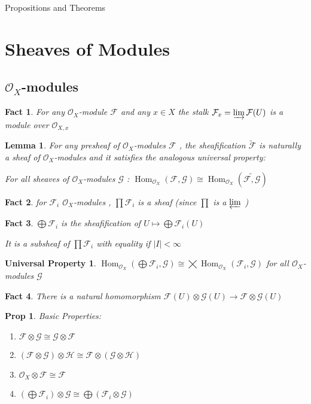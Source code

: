 \documentclass[a4paper, 12pt]{article}
\newcommand{\ca}[1]{\mathcal{#1}}
\newcommand{\caf}{\mathcal{F}}
\newcommand{\cag}{\mathcal{G}}
\newcommand{\oxmod}{$\mathcal{O}_X$-module }
\newcommand{\oxmods}{$\mathcal{O}_X$-modules }
\newcommand{\ox}{\mathcal{O}_X}
\newcommand{\oxx}{\mathcal{O}_{X,x}}
\newtheorem*{prop}{Prop}
\newtheorem*{lem}{Lemma}
\newtheorem*{fact}{Fact}
\newtheorem*{up}{Universal Property}
\DeclareMathOperator{\Hom}{Hom}
\begin{document}
		
			\tableofcontents
			
			
	\setcounter{section}{4}
	
	
	
	{\LARGE Propositions and Theorems}
		
	\section{Sheaves of Modules}
		
	\subsection{\oxmods}
	
	\begin{fact}
	For any \oxmod $ \caf $ and any $ x \in X $ the stalk $ \caf_x = \varinjlim \caf(U) $ is a module over $ \oxx $
	\end{fact}
	\begin{lem}
		For any presheaf of \oxmods $ \caf $ , the sheafification $ \tilde{\caf} $ is naturally a sheaf of \oxmods and it satisfies the analogous universal property:
		
		For all sheaves of \oxmods $ \cag $ : $ \Hom_{\ox}(\caf, \cag) \cong \Hom_{\ox} (\tilde{\caf , \cag}) $
		
	\end{lem}	
	\begin{fact}
	for $ \caf_i $ \oxmods, $ \prod \caf_i $ is a sheaf (since $\prod$ is a $\varprojlim$ )
	\end{fact}
	\begin{fact}
		$ \bigoplus\caf_i $ is the sheafification of $ U \mapsto \bigoplus \caf_i(U) $
		
		It is a subsheaf of $ \prod \caf_i $ with equality if $ |I|<\infty $
	\end{fact}
	\begin{up}
	 $ \Hom_{\ox}(\bigoplus \caf_i , \cag) \cong   \bigtimes \Hom_{\ox} ( \caf_i , \cag) $
	for all \oxmods $ \cag $
	\end{up}
	\begin{fact}
		There is a natural homomorphism $ \caf(U)\otimes\cag(U) \rightarrow \caf\otimes\cag(U) $
	\end{fact}
	
	\begin{prop}
	Basic Properties:
	
	\begin{enumerate}
		\item $\caf\otimes\cag \cong \cag\otimes\caf$
		\item $(\caf \otimes \cag)\otimes \ca{H} \cong \caf \otimes(\cag \otimes \ca{H})$
		\item $\ox \otimes \caf \cong \caf $
		\item $ (\bigoplus \caf_i) \otimes \cag  \cong \bigoplus (\caf_i \otimes \cag)$
	\end{enumerate}	
	\end{prop}
	
\end{document}
